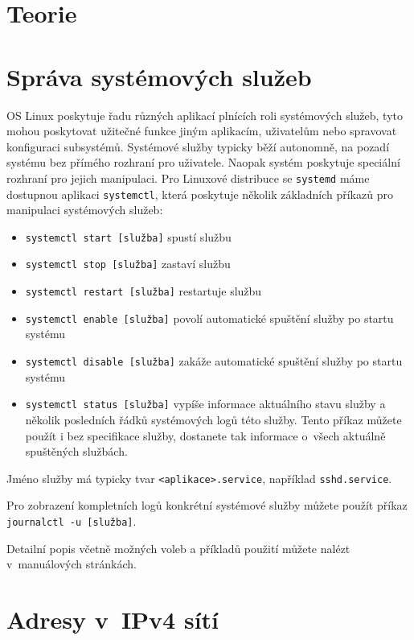 \setcounter{section}{0}
\section*{Teorie}
\section{Správa systémových služeb}\label{sluzby-teorie}
OS Linux poskytuje řadu různých aplikací plnících roli systémových služeb, tyto
mohou poskytovat užitečné funkce jiným aplikacím, uživatelům nebo spravovat
konfiguraci subsystémů. Systémové služby typicky běží autonomně, na pozadí
systému bez přímého rozhraní pro uživatele. Naopak systém poskytuje speciální
rozhraní pro jejich manipulaci. Pro Linuxové distribuce se \texttt{systemd} máme
dostupnou aplikaci \texttt{systemctl}, která poskytuje několik základních
příkazů pro manipulaci systémových služeb:
\begin{itemize}
    \item \texttt{systemctl start [služba]} spustí službu
    \item \texttt{systemctl stop [služba]} zastaví službu
    \item \texttt{systemctl restart [služba]} restartuje službu
    \item \texttt{systemctl enable [služba]} povolí automatické spuštění služby
        po startu systému
    \item \texttt{systemctl disable [služba]} zakáže automatické spuštění
        služby po startu systému
    \item \texttt{systemctl status [služba]} vypíše informace aktuálního stavu
        služby a několik posledních řádků systémových logů této služby. Tento
        příkaz můžete použít i bez specifikace služby, dostanete tak informace
        o~všech aktuálně spuštěných službách.
\end{itemize}

Jméno služby má typicky tvar \texttt{<aplikace>.service}, například
\texttt{sshd.service}.

Pro zobrazení kompletních logů konkrétní systémové služby můžete použít příkaz
\texttt{journalctl -u [služba]}.

Detailní popis včetně možných voleb a příkladů použití můžete nalézt
v~manuálových stránkách.

\section{Adresy v~IPv4 sítí}\label{ipv4-teorie}

